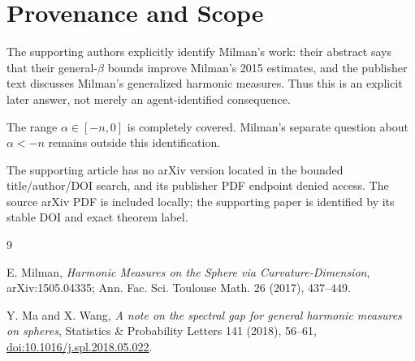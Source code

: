 \documentclass[11pt]{article}
\begin{document}
\section*{Provenance and Scope}

The supporting authors explicitly identify Milman's work: their abstract says
that their general-$\beta$ bounds improve Milman's 2015 estimates, and the
publisher text discusses Milman's generalized harmonic measures. Thus this is
an explicit later answer, not merely an agent-identified consequence.

The range $\alpha\in[-n,0]$ is completely covered. Milman's separate question
about $\alpha<-n$ remains outside this identification.

The supporting article has no arXiv version located in the bounded
title/author/DOI search, and its publisher PDF endpoint denied access. The
source arXiv PDF is included locally; the supporting paper is identified by
its stable DOI and exact theorem label.

\begin{thebibliography}{9}

E. Milman,
\emph{Harmonic Measures on the Sphere via Curvature-Dimension},
arXiv:1505.04335; Ann. Fac. Sci. Toulouse Math. 26 (2017), 437--449.

Y. Ma and X. Wang,
\emph{A note on the spectral gap for general harmonic measures on spheres},
Statistics \& Probability Letters 141 (2018), 56--61,
\href{https://doi.org/10.1016/j.spl.2018.05.022}{doi:10.1016/j.spl.2018.05.022}.

\end{thebibliography}
\end{document}
